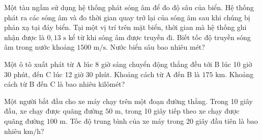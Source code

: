 \begin{ex} Một tàu ngầm sử dụng hệ thống phát sóng âm để đo độ sâu của biển. Hệ thống phát ra các sóng âm và đo thời gian quay trở lại của sóng âm sau khi chúng bị phản xạ tại đáy biển. Tại một vị trí trên mặt biển, thời gian mà hệ thống ghi nhận được là $0{,}13\text{ s}$ kể từ khi sóng âm được truyền đi. Biết tốc độ truyền sóng âm trong nước khoảng $1500\text{ m/s}$. Nước biển sâu bao nhiêu mét?

\par{}
\end{ex}

\begin{ex} Một ô tô xuất phát từ A lúc 8 giờ sáng chuyển động thẳng đều tới B lúc 10 giờ 30 phút, đến C lúc 12 giờ 30 phút. Khoảng cách từ A đến B là $175\text{ km}$. Khoảng cách từ B đến C là bao nhiêu kilômét?

\par{}
\end{ex}

\begin{ex} Một người bắt đầu cho xe máy chạy trên một đoạn đường thẳng. Trong 10 giây đầu, xe chạy được quãng đường $50\text{ m}$, trong 10 giây tiếp theo xe chạy được quãng đường $100\text{ m}$. Tốc độ trung bình của xe máy trong 20 giây đầu tiên là bao nhiêu $\text{km/h}$?

\par{}
\end{ex}

